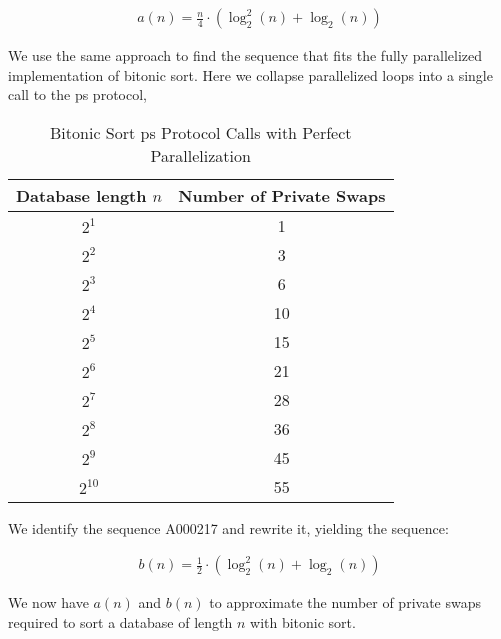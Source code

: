 \begin{gather*}
    a(n) = \frac{n}{4} \cdot \left( \log^2_2 \left( n \right) + \log_2 \left( n \right) \right)
\end{gather*}

We use the same approach to find the sequence that fits the fully parallelized implementation of bitonic sort. Here we collapse parallelized loops into a single call to the \acrshort{ps} protocol,


    \begin{table}[H]
        \centering
        \begin{threeparttable}
            \begin{tabular}{|c | c|} 
            \hline
            Database length $ n $ & Number of Private Swaps \\ [0.5ex] 
            \hline\hline
             $ 2^1 $ & 1 \\
             $ 2^2 $ & 3 \\
             $ 2^3 $ & 6 \\
             $ 2^4 $ & 10 \\
             $ 2^5 $ & 15 \\
             $ 2^6 $ & 21 \\
             $ 2^7 $ & 28 \\
             $ 2^8 $ & 36 \\
             $ 2^9 $ & 45 \\
             $ 2^{10} $ & 55 \\
            [1ex]
            \hline
            \end{tabular}
            \caption{Bitonic Sort \acrshort{ps} Protocol Calls with Perfect Parallelization}
            \label{tab:bitonicsortSequenceParallel}
        \end{threeparttable}
    \end{table}


We identify the sequence A000217 and rewrite it, yielding the sequence:

\begin{gather*}
    b(n) = \frac{1}{2} \cdot \left( \log^2_2 \left( n \right) + \log_2 \left( n \right) \right)
\end{gather*}

We now have $ a(n) $ and $ b(n) $ to approximate the number of private swaps required to sort a database of length $ n $ with bitonic sort.